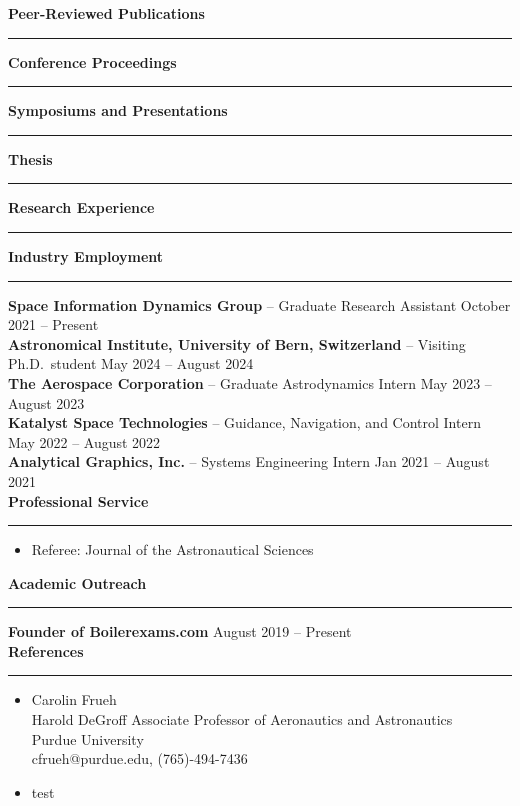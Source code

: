 \documentclass[10pt, a4paper]{article}
\newcommand{\sectiontitle}[1]{{\Large \textbf{#1}}\vspace{0.5em}\hrule\vspace{0.5em}}
\begin{document}
\nocite{*}
\sectiontitle{Peer-Reviewed Publications}
\printbibliography[heading=none, keyword={journal}, resetnumbers=true]

\nocite{*}
\sectiontitle{Conference Proceedings}
\printbibliography[heading=none, keyword={conference}, resetnumbers=true]

\nocite{*}
\sectiontitle{Symposiums and Presentations}
\printbibliography[heading=none, keyword={presentations}, resetnumbers=true]

\nocite{*}
\sectiontitle{Thesis}
\printbibliography[heading=none, keyword={thesis}, resetnumbers=true]

\sectiontitle{Research Experience}


\sectiontitle{Industry Employment}
\textbf{Space Information Dynamics Group} -- Graduate Research Assistant \hfill October 2021 -- Present \\
\textbf{Astronomical Institute, University of Bern, Switzerland} -- Visiting Ph.D.\ student \hfill May 2024 -- August 2024 \\
\textbf{The Aerospace Corporation} -- Graduate Astrodynamics Intern \hfill May 2023 -- August 2023 \\
\textbf{Katalyst Space Technologies} -- Guidance, Navigation, and Control Intern \hfill May 2022 -- August 2022 \\
\textbf{Analytical Graphics, Inc.} -- Systems Engineering Intern \hfill Jan 2021 -- August 2021 \\

\sectiontitle{Professional Service}

\begin{itemize}[noitemsep]
  \item Referee: Journal of the Astronautical Sciences
\end{itemize}

\sectiontitle{Academic Outreach}
\textbf{Founder of Boilerexams.com} \hfill August 2019 -- Present \\

\sectiontitle{References}

\begin{itemize}
  \item Carolin Frueh \\
Harold DeGroff Associate Professor of Aeronautics and Astronautics \\
Purdue University \\
cfrueh@purdue.edu, (765)-494-7436 \\
\item test
\end{itemize}
\end{document}

